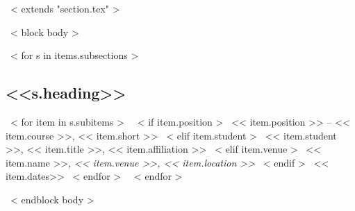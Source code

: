 ~< extends "section.tex" >~

~< block body >~

~< for s in items.subsections >~
    \subsection{<<s.heading>>}
    ~< for item in s.subitems >~
        ~< if item.position >~
            << item.position >> -- << item.course >>, << item.short >>
        ~< elif item.student >~
            << item.student >>, << item.title >>, << item.affiliation >>
        ~< elif item.venue >~
            << item.name >>, \small{\emph{<< item.venue >>, << item.location >>}}
        ~< endif >~
        \hfill
        << item.dates>>
        \newline
    ~< endfor >~    
~< endfor >~
    
~< endblock body >~
